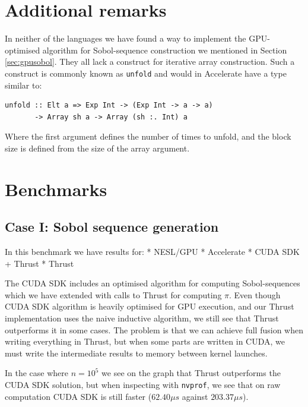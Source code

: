 \documentclass[preprint]{sigplanconf}
\begin{document}


\section{Additional remarks}
In neither of the languages we have found a way to implement the
GPU-optimised algorithm for Sobol-sequence construction we mentioned
in Section \ref{sec:gpusobol}. They all lack a construct for iterative
array construction. Such a construct is commonly known as
\verb|unfold| and would in Accelerate have a type similar to:

\begin{verbatim}
unfold :: Elt a => Exp Int -> (Exp Int -> a -> a)
       -> Array sh a -> Array (sh :. Int) a
\end{verbatim}
Where the first argument defines the number of times to unfold, and
the block size is defined from the size of the array argument.


\section{Benchmarks}

\subsection{Case I: Sobol sequence generation}
In this benchmark we have results for:
* NESL/GPU
* Accelerate
* CUDA SDK + Thrust
* Thrust

The CUDA SDK includes an optimised algorithm for computing
Sobol-sequences which we have extended with calls to Thrust for
computing $\pi$. Even though CUDA SDK algorithm is heavily optimised
for GPU execution, and our Thrust implementation uses the naive
inductive algorithm, we still see that Thrust outperforms it in some
cases. The problem is that we can achieve full fusion when writing
everything in Thrust, but when some parts are written in CUDA, we must
write the intermediate results to memory between kernel launches.

In the case where $n=10^5$ we see on the graph that Thrust outperforms
the CUDA SDK solution, but when inspecting with \verb|nvprof|, we
see that on raw computation CUDA SDK is still faster ($62.40 \mu s$
against $203.37\mu s$).
\end{document}
